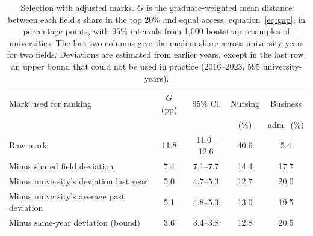 \begin{table}[t]
\centering
\caption{Selection with adjusted marks. $G$ is the graduate-weighted mean distance between each field's share in the top 20\% and equal access, equation~\eqref{eq:gap}, in percentage points, with 95\% intervals from 1,000 bootstrap resamples of universities. The last two columns give the median share across university-years for two fields. Deviations are estimated from earlier years, except in the last row, an upper bound that could not be used in practice (2016--2023, 595 university-years).}
\label{tab:adjusted}
\small
\setlength{\tabcolsep}{3.5pt}
\begin{tabularx}{\linewidth}{@{}>{\raggedright\arraybackslash}X c c c c@{}}
\toprule
Mark used for ranking & $G$ (pp) & 95\% CI & Nursing & Business \\
 & & & (\%) & adm.\ (\%) \\
\midrule
Raw mark & 11.8 & 11.0--12.6 & 40.6 & 5.4 \\
Minus shared field deviation & 7.4 & 7.1--7.7 & 14.4 & 17.7 \\
Minus university's deviation last year & 5.0 & 4.7--5.3 & 12.7 & 20.0 \\
Minus university's average past deviation & 5.1 & 4.8--5.3 & 13.0 & 19.5 \\
Minus same-year deviation (bound) & 3.6 & 3.4--3.8 & 12.8 & 20.5 \\
\bottomrule
\end{tabularx}
\end{table}
